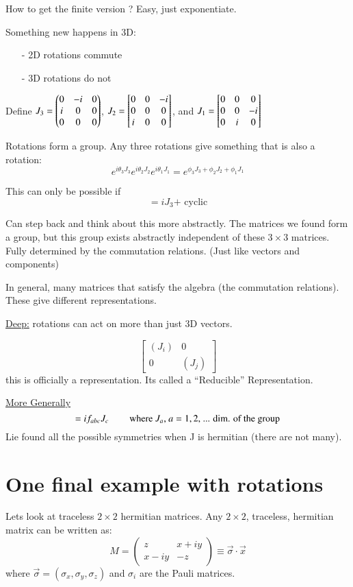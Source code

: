 {How to get the finite version ? 
Easy, just exponentiate. 

Something new happens in 3D:
\begin{itemize}
\item[-]2D rotations commute        
\item[-]3D rotations do not
\end{itemize}

Define $J_3 = \begin{pmatrix} 0 & -i & 0 \\ i & 0 & 0 \\ 0 & 0 & 0 \end{pmatrix}$, $J_2 = \begin{bmatrix} 0 & 0 & -i \\ 0 & 0 & 0 \\ i & 0 & 0 \end{bmatrix}$, and $J_1 = \begin{bmatrix} 0 & 0 & 0 \\ 0 & 0 & -i \\ 0 & i & 0 \end{bmatrix}$

Rotations form a group.
Any three rotations give something that is also a rotation: 
\begin{equation*}
e^{i\theta_3 J_3}e^{i\theta_2 J_2}e^{i\theta_1 J_1} = e^{\phi_3 J_3 + \phi_2 J_2 + \phi_1 J_1}
\end{equation*}

This can only be possible if
\begin{equation*}
[J_1, J_2] = i J_3  \textrm{+ cyclic}
\end{equation*}


Can step back and think about this more abstractly. 
The matrices  we found form a group, but this group exists abstractly independent of these $3\times3$ matrices.
Fully determined by the commutation relations.
(Just like vectors and components)

In general, many matrices that satisfy the algebra (the commutation relations). 
These give different representations.

\underline{Deep:} rotations can act on more than just 3D vectors.

\begin{equation*}
\begin{bmatrix} \left(J_i\right) &  0  \\ 0  & \left(J_j\right) \end{bmatrix}
\end{equation*}
this is officially a representation.  
Its called a ``Reducible'' Representation.

\underline{More Generally} 
\begin{equation*}
[J_a, J_b] = i f_{abc} J_c \hspace{0.3in} \textrm{where $J_a$, $ a = 1, 2,$ ... dim. of the group}
\end{equation*}
Lie found all the possible symmetries when J is hermitian (there are not many).

\section*{One final example with rotations}
Lets look at traceless $2\times2$ hermitian matrices. 
Any $2\times2$, traceless, hermitian matrix can be written as: 
\begin{equation*}
M = \begin{pmatrix} z &  x+iy  \\ x-iy  & -z \end{pmatrix} \equiv \vec{\sigma} \cdot \vec{x}
\end{equation*}
where $\vec{\sigma} = (\sigma_x, \sigma_y, \sigma_z)$ and $\sigma_i$ are the Pauli matrices.

}

